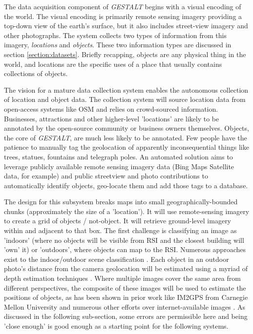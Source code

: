 The data acquisition component of \textit{GESTALT} begins with a visual encoding of the world. 
The visual encoding is primarily remote sensing imagery providing a top-down view of the earth's surface, but it also includes street-view imagery and other photographs. 
The system collects two types of information from this imagery, \textit{locations} and \textit{objects}. 
These two information types are discussed in section \ref{section:datasets}. 
Briefly recapping, objects are any physical thing in the world, and locations are the specific uses of a place that usually contains collections of objects. 

The vision for a mature data collection system enables the autonomous collection of location and object data. 
The collection system will source location data from open-access systems like OSM and relies on crowd-sourced information. 
Businesses, attractions and other higher-level 'locations' are likely to be annotated by the open-source community or business owners themselves. 
Objects, the core of \textit{GESTALT}, are much less likely to be annotated. Few people have the patience to manually tag the geolocation of apparently inconsequential things like trees, statues, fountains and telegraph poles. 
An automated solution aims to leverage publicly available remote sensing imagery data (Bing Maps Satellite data, for example) and public streetview and photo contributions to automatically identify objects, geo-locate them and add those tags to a database. 

The design for this subsystem breaks maps into small geographically-bounded chunks (approximately the size of a 'location'). 
It will use remote-sensing imagery to create a grid of objects / not-object. It will retrieve ground-level imagery within and adjacent to that box.
The first challenge is classifying an image as 'indoors' (where no objects will be visible from RSI and the closest building will 'own' it) or 'outdoors', where objects can map to the RSI. Numerous approaches exist to the indoor/outdoor scene classification \cite{Tong2017}. 
Each object in an outdoor photo's distance from the camera geolocation will be estimated using a myriad of depth estimation techniques \cite{Ming2021,Liu2020}. 
Where multiple images cover the same area from different perspectives, the composite of these images will be used to estimate the positions of objects, as has been shown in prior work like IM2GPS from Carnegie Mellon University \cite{Hays2008} and numerous other efforts over internet-available images \cite{Snavely2011}. 
As discussed in the following sub-section, some errors are permissible here and being 'close enough' is good enough as a starting point for the following systems. 





